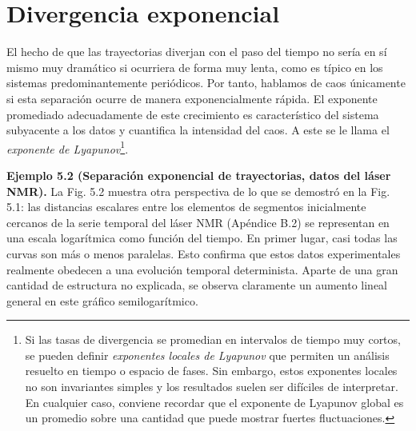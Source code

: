 \documentclass[10pt,a4paper]{book}
\begin{document}
\newpage

\section{Divergencia exponencial}

El hecho de que las trayectorias diverjan con el paso del tiempo no sería en sí mismo muy dramático si ocurriera de forma muy lenta, como es típico en los sistemas predominantemente periódicos. Por tanto, hablamos de caos únicamente si esta separación ocurre de manera exponencialmente rápida. El exponente promediado adecuadamente de este crecimiento es característico del sistema subyacente a los datos y cuantifica la intensidad del caos. A este se le llama el \textit{exponente de Lyapunov}\footnote{Si las tasas de divergencia se promedian en intervalos de tiempo muy cortos, se pueden definir \textit{exponentes locales de Lyapunov} que permiten un análisis resuelto en tiempo o espacio de fases. Sin embargo, estos exponentes locales no son invariantes simples y los resultados suelen ser difíciles de interpretar. En cualquier caso, conviene recordar que el exponente de Lyapunov global es un promedio sobre una cantidad que puede mostrar fuertes fluctuaciones.}.  

\bigskip

\textbf{Ejemplo 5.2 (Separación exponencial de trayectorias, datos del láser NMR).} 
La Fig. 5.2 muestra otra perspectiva de lo que se demostró en la Fig. 5.1: las distancias escalares entre los elementos de segmentos inicialmente cercanos de la serie temporal del láser NMR (Apéndice B.2) se representan en una escala logarítmica como función del tiempo. En primer lugar, casi todas las curvas son más o menos paralelas. Esto confirma que estos datos experimentales realmente obedecen a una evolución temporal determinista. Aparte de una gran cantidad de estructura no explicada, se observa claramente un aumento lineal general en este gráfico semilogarítmico.  

\bigskip
\end{document}
